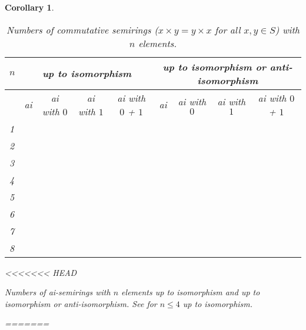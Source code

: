 \documentclass{article}
\theoremstyle{definition}
\theoremstyle{plain}
\newtheorem{cor}[defn]{Corollary}
\begin{document}
\begin{cor}
\begin{table}[ht]
  \centering
  \begin{tabular}{l|r|r|r|r|r|r|r|r}
    $n$
    & \multicolumn{4}{c|}{up to isomorphism}
    & \multicolumn{4}{c}{up to isomorphism or anti-isomorphism} \\
    \midrule
    & \multicolumn{1}{c|}{ai} & \multicolumn{1}{c|}{ai with $0$}
    & \multicolumn{1}{c|}{ai with $1$} & \multicolumn{1}{c|}{ai with $0$ + $1$}
    & \multicolumn{1}{c|}{ai} & \multicolumn{1}{c}{ai with $0$}
    & \multicolumn{1}{c|}{ai with $1$} & \multicolumn{1}{c|}{ai with $0$ + $1$}
    \\
    \midrule
    1 &              &          &&&          &       \\
    2 &              &          &&&          &       \\
    3 &             &         &&&          &       \\
    4 &            &        &&&         & \\
    5 &         &      &&&        & \\
    6 &        &    &&&      & \\
    7 &      &  &&&     & \\
    8 & & &&&    & \\
  \end{tabular}
<<<<<<< HEAD
  \caption{Numbers of ai-semirings with $n$ elements up to isomorphism and up
    to isomorphism or anti-isomorphism. See \cite{MSidempotentSemirings} for \(n\leq4\) up to isomorphism.}
=======
  \caption{Numbers of commutative semirings ($x\times y = y \times
  x$ for all $x,y\in S$) with $n$ elements.}
  \label{tab:comm-semirings}
\end{table}


\end{cor}
\end{document}
